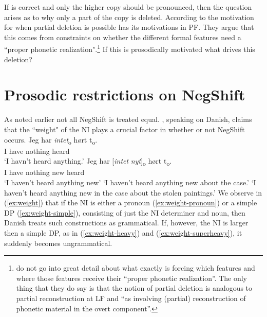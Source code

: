 \documentclass[12pt, letterpaper]{article}
\begin{document}
\z 
If \citet{chomskyMinimalistProgramLinguistic1993} is correct and only the higher copy should be pronounced, then the question arises as to why only a part of the copy is deleted. According to \citet{fanselowRemarksEconomyPronunciation2001,fanselowDistributedDeletion2002} the motivation for when partial deletion is possible has its motivations in PF. They argue that this comes from constraints on whether the different formal features need a ``proper phonetic realization".\footnote{\citet{fanselowRemarksEconomyPronunciation2001,fanselowDistributedDeletion2002} do not go into great detail about what exactly is forcing which features and where those features receive their ``proper phonetic realization''. The only thing that they do say is that the notion of partial deletion is analogous to partial reconstruction at LF and ``as involving (partial) reconstruction of phonetic material in the overt component''.} If this is prosodically motivated what drives this deletion?

\section{Prosodic restrictions on NegShift} \label{sec:PROSODY}

As noted earlier not all NegShift is treated equal. \citet[65f]{christensenInterfacesNegationSyntax2005}, speaking on Danish, claims that the ``weight" of the NI plays a crucial factor in whether or not NegShift occurs. 
	\ea \label{ex:weight}
		\ea \label{ex:weight-pronoun}
		\gll Jeg har \textit{intet}\textsubscript{o} hørt t\textsubscript{o}.\\
		I have nothing heard\\
		\glt  `I havn't heard anything.'
		\ex \label{ex:weight-simple}
		\gll Jeg har [\textit{intet} \textit{nyt}]\textsubscript{o} hørt t\textsubscript{o}.\\
		I have nothing new heard\\
		\glt `I haven't heard anything new'
		\glt `I haven't heard anything new about the case.' \label{ex:weight-heavy}
		\glt `I haven't heard anything new in the case about the stolen paintings.' \label{ex:weight-superheavy}
		\z 
	\z
We observe in (\ref{ex:weight}) that if the NI is either a pronoun (\ref{ex:weight-pronoun}) or a simple DP (\ref{ex:weight-simple}), consisting of just the NI determiner and noun, then Danish treats such constructions as grammatical. If, however, the NI is larger then a simple DP, as in (\ref{ex:weight-heavy}) and (\ref{ex:weight-superheavy}), it suddenly becomes ungrammatical. 
\end{document}
